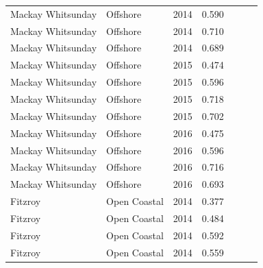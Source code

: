 \begin{longtable}{llccccc}
  Mackay Whitsunday & Offshore & 2014 & 0.590 & \cellcolor[HTML]{F0C918}{C} & \cellcolor[HTML]{F0C918}{C} & \cellcolor[HTML]{F0C918}{C} \\ 
  Mackay Whitsunday & Offshore & 2014 & 0.710 & \cellcolor[HTML]{B0D235}{B} & \cellcolor[HTML]{B0D235}{B} & \cellcolor[HTML]{B0D235}{B} \\ 
  Mackay Whitsunday & Offshore & 2014 & 0.689 & \cellcolor[HTML]{B0D235}{B} & \cellcolor[HTML]{B0D235}{B} & \cellcolor[HTML]{B0D235}{B} \\ 
  Mackay Whitsunday & Offshore & 2015 & 0.474 & \cellcolor[HTML]{F47721}{D} & \cellcolor[HTML]{F0C918}{C} & \cellcolor[HTML]{F47721}{D} \\ 
  Mackay Whitsunday & Offshore & 2015 & 0.596 & \cellcolor[HTML]{F0C918}{C} & \cellcolor[HTML]{F0C918}{C} & \cellcolor[HTML]{F0C918}{C} \\ 
  Mackay Whitsunday & Offshore & 2015 & 0.718 & \cellcolor[HTML]{B0D235}{B} & \cellcolor[HTML]{B0D235}{B} & \cellcolor[HTML]{B0D235}{B} \\ 
  Mackay Whitsunday & Offshore & 2015 & 0.702 & \cellcolor[HTML]{B0D235}{B} & \cellcolor[HTML]{B0D235}{B} & \cellcolor[HTML]{B0D235}{B} \\ 
  Mackay Whitsunday & Offshore & 2016 & 0.475 & \cellcolor[HTML]{F47721}{D} & \cellcolor[HTML]{F0C918}{C} & \cellcolor[HTML]{F47721}{D} \\ 
  Mackay Whitsunday & Offshore & 2016 & 0.596 & \cellcolor[HTML]{F0C918}{C} & \cellcolor[HTML]{F0C918}{C} & \cellcolor[HTML]{F0C918}{C} \\ 
  Mackay Whitsunday & Offshore & 2016 & 0.716 & \cellcolor[HTML]{B0D235}{B} & \cellcolor[HTML]{B0D235}{B} & \cellcolor[HTML]{B0D235}{B} \\ 
  Mackay Whitsunday & Offshore & 2016 & 0.693 & \cellcolor[HTML]{B0D235}{B} & \cellcolor[HTML]{B0D235}{B} & \cellcolor[HTML]{B0D235}{B} \\ 
  Fitzroy & Open Coastal & 2014 & 0.377 & \cellcolor[HTML]{F47721}{D} & \cellcolor[HTML]{F47721}{D} & \cellcolor[HTML]{F47721}{D} \\ 
  Fitzroy & Open Coastal & 2014 & 0.484 & \cellcolor[HTML]{F47721}{D} & \cellcolor[HTML]{F0C918}{C} & \cellcolor[HTML]{F47721}{D} \\ 
  Fitzroy & Open Coastal & 2014 & 0.592 & \cellcolor[HTML]{F0C918}{C} & \cellcolor[HTML]{F0C918}{C} & \cellcolor[HTML]{F0C918}{C} \\ 
  Fitzroy & Open Coastal & 2014 & 0.559 & \cellcolor[HTML]{F0C918}{C} & \cellcolor[HTML]{F0C918}{C} & \cellcolor[HTML]{F0C918}{C} \\ 

\end{longtable}
